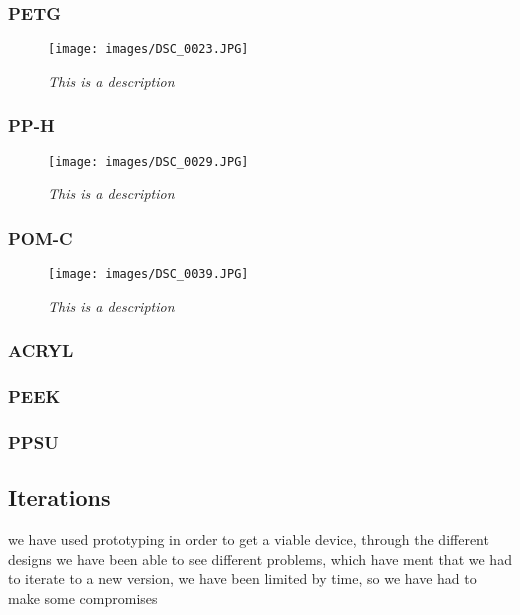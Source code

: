 \subsubsection{PETG}
\begin{figure}[h]
	\begin{center}
		\texttt{[image: images/DSC\_0023.JPG]}
		\caption{\small {\it {This is a description}}} \label{fig:explode}
	\end{center}
\end{figure}
\subsubsection{PP-H}
\begin{figure}[h]
	\begin{center}
		\texttt{[image: images/DSC\_0029.JPG]}
		\caption{\small {\it {This is a description}}} \label{fig:explode}
	\end{center}
\end{figure}
\subsubsection{POM-C}
\begin{figure}[h]
	\begin{center}
		\texttt{[image: images/DSC\_0039.JPG]}
		\caption{\small {\it {This is a description}}} \label{fig:explode}
	\end{center}
\end{figure}
\subsubsection{ACRYL}
\subsubsection{PEEK}
\subsubsection{PPSU}

\subsection{Iterations}
we have used prototyping in order to get a viable device, through the different designs we have been able to see different problems, which have ment that we had to iterate to a new version, we have been limited by time, so we have had to make some compromises

